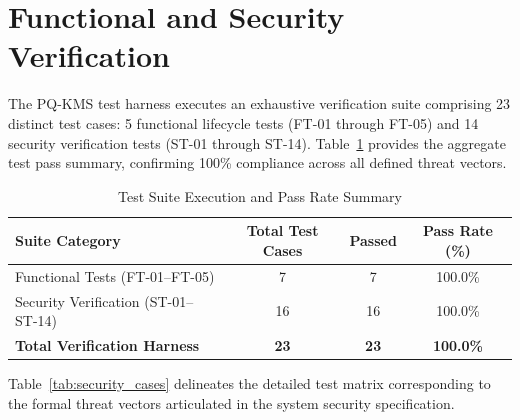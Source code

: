 \section{Functional and Security Verification}
The PQ-KMS test harness executes an exhaustive verification suite comprising 23 distinct test cases: 5 functional lifecycle tests (FT-01 through FT-05) and 14 security verification tests (ST-01 through ST-14). Table~\ref{tab:test_summary} provides the aggregate test pass summary, confirming 100\% compliance across all defined threat vectors.

\begin{table}[htbp]
\centering
\caption{Test Suite Execution and Pass Rate Summary}
\label{tab:test_summary}
\begin{tabular}{lccc}
\hline
\textbf{Suite Category} & \textbf{Total Test Cases} & \textbf{Passed} & \textbf{Pass Rate (\%)} \\
\hline
Functional Tests (FT-01--FT-05) & 7 & 7 & 100.0\% \\
Security Verification (ST-01--ST-14) & 16 & 16 & 100.0\% \\
\hline
\textbf{Total Verification Harness} & \textbf{23} & \textbf{23} & \textbf{100.0\%} \\
\hline
\end{tabular}
\end{table}

Table~\ref{tab:security_cases} delineates the detailed test matrix corresponding to the formal threat vectors articulated in the system security specification.

